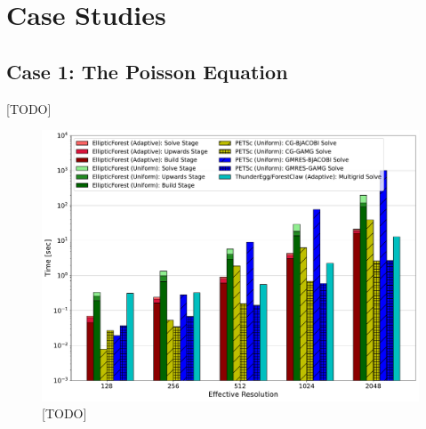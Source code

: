 \section{Case Studies}
\label{sec:case-studies}

\subsection{Case 1: The Poisson Equation}

[TODO]

\begin{figure}
    \centering
    \includegraphics[width=1.0\textwidth, clip=true, trim={60 20 100 60}]{figures/case01-stacked-bar-plot-comparisons-no-title.pdf}
    \caption{[TODO]}
    \label{fig:case01-stacked-bar-plot}
\end{figure}

